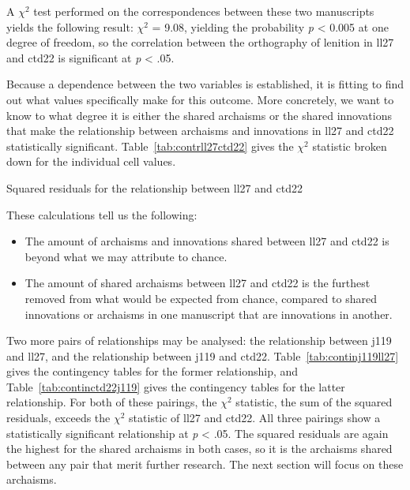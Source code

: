 
A \(\chi^2\) test performed on the correspondences between these two manuscripts yields the following result: \(\chi^2\) = 9.08, yielding the probability \emph{p} < 0.005 at one degree of freedom, so the correlation between the orthography of lenition in \gls{ll27} and \gls{ctd22} is  significant at \textit{p} < .05.

Because a dependence between the two variables is established, it is fitting to find out what values specifically make for this outcome. More concretely, we want to know to what degree it is either the shared archaisms or the shared innovations that make the relationship between archaisms and innovations in \gls{ll27} and \gls{ctd22} statistically significant. Table~\ref{tab:contrll27ctd22} gives the \(\chi^2\) statistic broken down for the individual cell values.

\begin{table}[h]
  \centering
  
  \caption{Squared residuals for the relationship between \gls{ll27} and \gls{ctd22}}
  \label{tab:contrll27ctd22}
\end{table}

These calculations tell us the following:
\begin{itemize}
\item The amount of archaisms and innovations shared between \gls{ll27} and \gls{ctd22} is beyond what we may attribute to chance.
\item The amount of shared archaisms between \gls{ll27} and \gls{ctd22} is the furthest removed from what would be expected from chance, compared to shared innovations or archaisms in one manuscript that are innovations in another.
\end{itemize}

Two more pairs of relationships may be analysed: the relationship between \gls{j119} and \gls{ll27}, and the relationship between \gls{j119} and \gls{ctd22}. Table~\ref{tab:continj119ll27} gives the contingency tables for the former relationship, and Table~\ref{tab:continctd22j119} gives the contingency tables for the latter relationship. For both of these pairings, the \(\chi^2\) statistic, \ie the sum of the squared residuals, exceeds the \(\chi^2\) statistic of \gls{ll27} and \gls{ctd22}. All three pairings show a statistically significant relationship at \textit{p} < .05. The squared residuals are again the highest for the shared archaisms in both cases, so it is the archaisms shared between any pair that merit further research. The next section will focus on these archaisms.

